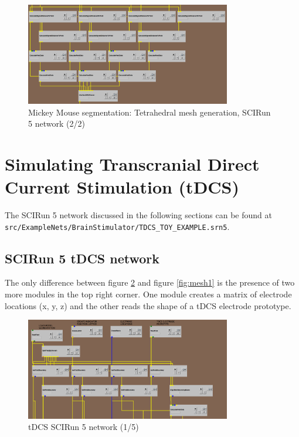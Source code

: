 \documentclass[fleqn,11pt,openany]{book}
\begin{document}
\begin{figure}[!h]
\centering
\includegraphics[width=0.8\textwidth]{BrainStimulation_figures/make_mesh2.png}
\caption{ Mickey Mouse segmentation: Tetrahedral mesh generation, SCIRun 5 network (2/2)}
\label{fig:mesh2}
\end{figure}


\section{Simulating Transcranial Direct Current Stimulation (tDCS)}\label{sec:sim_tdcs}
The SCIRun 5 network discussed in the following sections can be found at \\ \texttt{src/ExampleNets/BrainStimulator/TDCS\_TOY\_EXAMPLE.srn5}.

\subsection{SCIRun 5 tDCS network}
The only difference between figure \ref{fig:tdcs1} and figure \ref{fig:mesh1} is the presence of two more modules in the top right corner. One module creates a matrix of electrode locations (x, y, z) and
the other reads the shape of a tDCS electrode prototype.

\begin{figure}[!h]
\centering
\includegraphics[width=0.8\textwidth]{BrainStimulation_figures/tdcs_1.png}
\caption{ tDCS SCIRun 5 network (1/5)}
\label{fig:tdcs1}
\end{figure}
\end{document}
